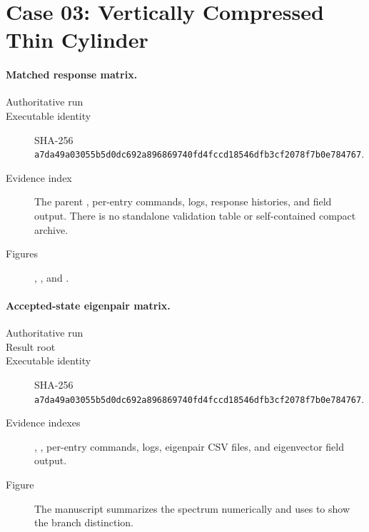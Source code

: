 \documentclass[11pt]{article}
\newcommand{\sha}[2]{\texttt{#1}\allowbreak\texttt{#2}}
\begin{document}
\section*{Case 03: Vertically Compressed Thin Cylinder}

\paragraph{Matched response matrix.}
\begin{description}
  \item[Authoritative run] 
  \item[Executable identity] SHA-256 \sha{a7da49a03055b5d0dc692a896869740f}{d4fccd18546dfb3cf2078f7b0e784767}.
  \item[Evidence index] The parent , per-entry commands, logs, response histories, and field output.  There is no standalone validation table or self-contained compact archive.
  \item[Figures] , , and .
\end{description}

\paragraph{Accepted-state eigenpair matrix.}
\begin{description}
  \item[Authoritative run] 
  \item[Result root] 
  \item[Executable identity] SHA-256 \sha{a7da49a03055b5d0dc692a896869740f}{d4fccd18546dfb3cf2078f7b0e784767}.
  \item[Evidence indexes] , , per-entry commands, logs, eigenpair CSV files, and eigenvector field output.
  \item[Figure] The manuscript summarizes the spectrum numerically and uses  to show the branch distinction.
\end{description}
\end{document}
